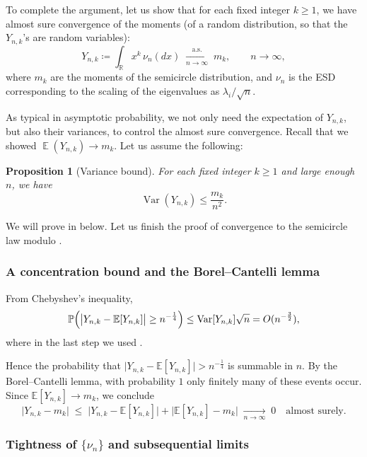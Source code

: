 \documentclass[letterpaper,11pt,oneside,reqno]{article}
\numberwithin{equation}{section}
\newtheorem{proposition}{Proposition}[section]
\theoremstyle{definition}
\begin{document}
To complete the argument, let us show that for each fixed integer \(k\ge1\),
we have almost sure convergence of the moments (of a
random distribution, so that the $Y_{n,k}$'s are random variables):
\[
Y_{n,k}\coloneqq\int_{\mathbb{R}}x^k\,\nu_n(dx)
  \;\xrightarrow[n\to\infty]{\text{a.s.}}\;
	m_{k},
	\qquad n\to\infty,
\]
where $m_k$ are the moments of the semicircle distribution,
and $\nu_n$ is the ESD corresponding to the scaling of the
eigenvalues as $\lambda_i/\sqrt n$.

As typical in asymptotic probability, we not only need the
expectation of $Y_{n,k}$, but also their variances,
to control the almost sure convergence.
Recall that
we showed $\operatorname{\mathbb{E}}(Y_{n,k})\to m_k$.
Let us assume the following:
\begin{proposition}[Variance bound]
	\label{prop:variance-bound}
	For each fixed integer \(k\ge1\) and large enough \(n\),
	we have
	\begin{equation*}
	\operatorname{\mathrm{Var}}(Y_{n,k})\le \frac{m_k}{n^2}.
	\end{equation*}
\end{proposition}
We will prove  in 
below.
Let us finish the proof of convergence to the semicircle law modulo .


\subsubsection{A concentration bound and the Borel--Cantelli lemma}
From Chebyshev's inequality,
\[
  \mathbb{P}\Bigl(\bigl|Y_{n,k} - \mathbb{E}[Y_{n,k}]\bigr|
	\ge n^{-\frac{1}{4}}\Bigr)
  \le
  \operatorname{\mathrm{Var}}[Y_{n,k}]\sqrt{n}
	=O(n^{-\frac{3}{2}}),
\]
where in the last step we used .

Hence the probability that \(\lvert Y_{n,k} - \mathbb{E}[Y_{n,k}]\rvert > n^{-\frac{1}{4}}\) is summable in \(n\).  By the Borel--Cantelli lemma, with probability \(1\) only finitely many of these events occur.  Since \(\mathbb{E}[Y_{n,k}]\to m_k\), we conclude
\[
  \bigl|Y_{n,k} - m_k\bigr|
  \;\le\;\bigl|Y_{n,k}-\mathbb{E}[Y_{n,k}]\bigr|
  +\bigl|\mathbb{E}[Y_{n,k}]-m_k\bigr|
  \;\xrightarrow[n\to\infty]{}\;0
  \quad
  \text{almost surely.}
\]

\subsubsection{Tightness of \(\{\nu_n\}\) and subsequential limits}
\label{subsub:semicircle-tightness}
\end{document}
